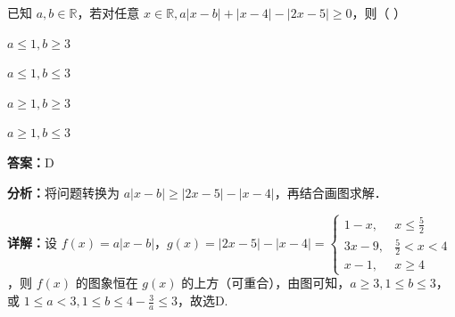 \begin{question}[points=4]
已知 $a,b \in \mathbb{R}$，若对任意 $x \in \mathbb{R}, a|x-b| + |x-4| - |2x-5| \ge 0$，则（ ）
\begin{choices}
  \item $a \le 1, b \ge 3$
  \item $a \le 1, b \le 3$
  \item $a \ge 1, b \ge 3$
  \item $a \ge 1, b \le 3$
\end{choices}
\begin{solution}
\textbf{答案：}D

\textbf{分析：}将问题转换为 $a|x-b| \ge |2x-5| - |x-4|$，再结合画图求解．

\textbf{详解：}设 $f(x)=a|x-b|$，$g(x)=|2x-5|-|x-4| = \begin{cases} 1-x, & x \le \frac{5}{2} \\ 3x-9, & \frac{5}{2} < x < 4 \\ x-1, & x \ge 4 \end{cases}$，则 $f(x)$ 的图象恒在 $g(x)$ 的上方（可重合），由图可知，$a \ge 3, 1 \le b \le 3$，或 $1 \le a < 3, 1 \le b \le 4-\frac{3}{a} \le 3$，故选D.
\end{solution}
\end{question}

